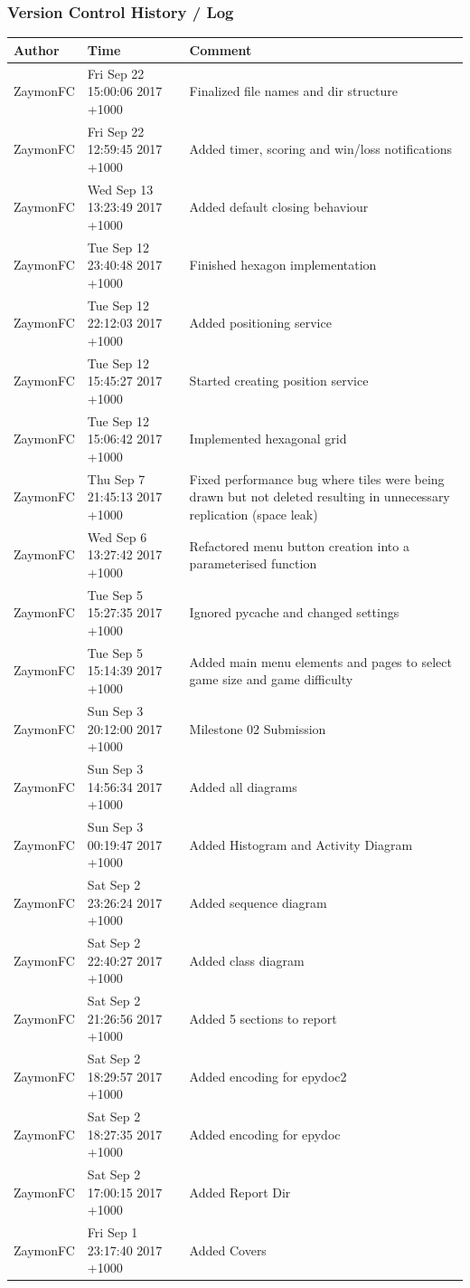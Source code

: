 \documentclass[12pt, a4]{report}
\begin{document}
\subsubsection{Version Control History / Log}
\begin{table}[!h]
	\begin{tabular}{ll p{7cm}}
	Author				  & Time   			& Comment \\ \hline
	ZaymonFC & Fri Sep 22 15:00:06 2017 +1000 & Finalized file names and dir structure \\
	ZaymonFC & Fri Sep 22 12:59:45 2017 +1000 & Added timer, scoring and win/loss notifications \\
	ZaymonFC & Wed Sep 13 13:23:49 2017 +1000 & Added default closing behaviour \\
	ZaymonFC & Tue Sep 12 23:40:48 2017 +1000 & Finished hexagon implementation \\
	ZaymonFC & Tue Sep 12 22:12:03 2017 +1000 & Added positioning service \\
	ZaymonFC & Tue Sep 12 15:45:27 2017 +1000 & Started creating position service \\
	ZaymonFC & Tue Sep 12 15:06:42 2017 +1000 & Implemented hexagonal grid \\
	ZaymonFC & Thu Sep 7 21:45:13 2017 +1000 &  Fixed performance bug where tiles were being drawn but not deleted resulting in unnecessary replication (space leak) \\
	ZaymonFC & Wed Sep 6 13:27:42 2017 +1000 &  Refactored menu button creation into a parameterised function \\
	ZaymonFC & Tue Sep 5 15:27:35 2017 +1000 &  Ignored pycache and changed settings \\
	ZaymonFC & Tue Sep 5 15:14:39 2017 +1000 &  Added main menu elements and pages to select game size and game difficulty \\
	ZaymonFC & Sun Sep 3 20:12:00 2017 +1000 &  Milestone 02 Submission \\
	ZaymonFC & Sun Sep 3 14:56:34 2017 +1000 &  Added all diagrams \\
	ZaymonFC & Sun Sep 3 00:19:47 2017 +1000 &  Added Histogram and Activity Diagram \\
	ZaymonFC & Sat Sep 2 23:26:24 2017 +1000 &  Added sequence diagram \\
	ZaymonFC & Sat Sep 2 22:40:27 2017 +1000 &  Added class diagram \\
	ZaymonFC & Sat Sep 2 21:26:56 2017 +1000 &  Added 5 sections to report \\
	ZaymonFC & Sat Sep 2 18:29:57 2017 +1000 &  Added encoding for epydoc2 \\
	ZaymonFC & Sat Sep 2 18:27:35 2017 +1000 &  Added encoding for epydoc \\
	ZaymonFC & Sat Sep 2 17:00:15 2017 +1000 &  Added Report Dir \\
	ZaymonFC & Fri Sep 1 23:17:40 2017 +1000 &  Added Covers
	\end{tabular}
	\end{table}
	
\end{document}
